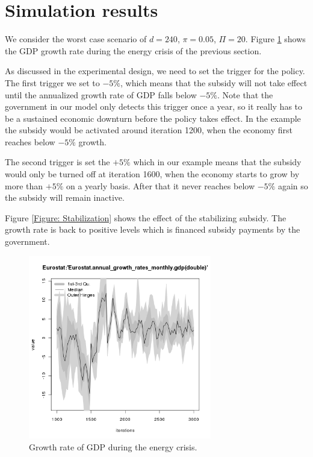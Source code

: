 
\section{Simulation results}
We consider the worst case scenario of $d=240$, $\pi=0.05$, $\Pi=20$.
Figure \ref{Figure: energy shock 4 growth} shows the GDP growth rate during the energy crisis of the previous section. 

As discussed in the experimental design, we need to set the trigger for the policy.
The first trigger we set to $-5\%$, which means that the subsidy will not take effect until the annualized growth rate of GDP falls below $-5\%$. Note that the government in our model only detects this trigger once a year, so it really has to be a sustained economic downturn before the policy takes effect. In the example the subsidy would be activated around iteration 1200, when the economy first reaches below $-5\%$ growth.

The second trigger is set the $+5\%$ which in our example means that the subsidy would only be turned off at iteration 1600, when the economy starts to grow by more than $+5\%$ on a yearly basis. After that it never reaches below $-5\%$ again so the subsidy will remain inactive.

Figure \ref{Figure: Stabilization} shows the effect of the stabilizing subsidy. The growth rate is back to positive levels which is financed subsidy payments by the government.

\begin{figure}[ht!]
\centering\leavevmode
\begin{minipage}{17cm}
\centering\leavevmode
\includegraphics[width=8cm]{./energy_shock/png/duration_240/intensity_0.05/frequency_20/Eurostat-annual_growth_rates_monthly_gdp.png}
\end{minipage}
\caption{Growth rate of GDP during the energy crisis.}
\label{Figure: energy shock 4 growth}
\end{figure}

